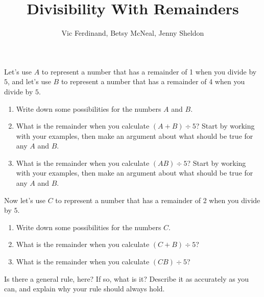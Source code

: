 \documentclass[nooutcomes]{ximera}
\title{Divisibility With Remainders}
\author{Vic Ferdinand, Betsy McNeal, Jenny Sheldon}
\begin{document}
\begin{abstract} \end{abstract}
\maketitle



\begin{problem} Let's use $A$ to represent a number that has a remainder of 1 when you divide by $5$, and let's use $B$ to represent a number that has a remainder of 4 when you divide by $5$.
\begin{enumerate}
\item Write down some possibilities for the numbers $A$ and $B$.
\item  What is the remainder when you calculate $(A + B) \div 5$?  Start by working with your examples, then make an argument about what should be true for any $A$ and $B$.
\item  What is the remainder when you calculate $(AB) \div 5$?  Start by working with your examples, then make an argument about what should be true for any $A$ and $B$.
\end{enumerate}
\end{problem}

\begin{problem}
Now let's use $C$ to represent a number that has a remainder of 2 when you divide by $5$.
\begin{enumerate}
\item  Write down some possibilities for the numbers $C$.
\item   What is the remainder when you calculate $(C + B) \div 5$?  
\item  What is the remainder when you calculate $(CB) \div 5$?
\end{enumerate}
\end{problem}

\begin{problem}
  Is there a general rule, here?  If so, what is it?  Describe it as accurately as you can, and explain why your rule should always hold.
\end{problem}
\end{document}
